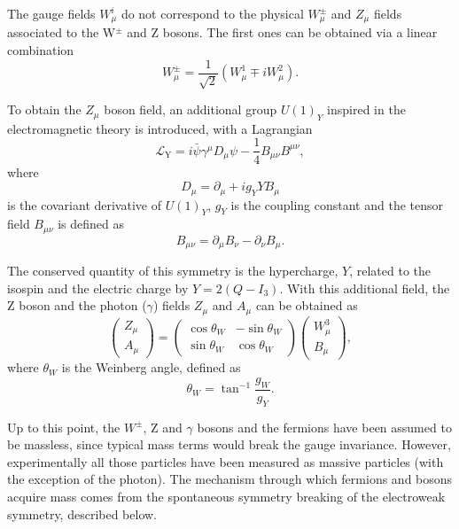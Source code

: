 \documentclass[../main.tex]{subfiles}
\begin{document}
The gauge fields $W_\mu^i$ do not correspond to the physical $W_\mu^\pm$ and $Z_\mu$ fields associated to the W${}^\pm$ and Z bosons. The first ones can be obtained via a linear combination
\begin{equation}
\label{theo:eq:w}
W_\mu^\pm = \frac{1}{\sqrt{2}}(W_\mu^1 \mp i W_\mu^2).
\end{equation}

To obtain the $Z_\mu$ boson field, an additional group $U(1)_Y$ inspired in the electromagnetic theory is introduced, with a Lagrangian
\begin{equation}
\mathcal{L}_\text{Y} = i\bar{\psi}\gamma^\mu D_\mu \psi - \frac{1}{4}B_{\mu\nu}B^{\mu\nu},
\end{equation}
where
\begin{equation}
D_\mu = \partial_\mu + ig_Y Y B_\mu
\end{equation}
is the covariant derivative of $U(1)_Y$, $g_Y$ is the coupling constant and the tensor field $B_{\mu\nu}$ is defined as
\begin{equation}
B_{\mu\nu} = \partial_\mu B_\nu - \partial_\nu B_\mu.
\end{equation}

The conserved quantity of this symmetry is the hypercharge, $Y$, related to the isospin and the electric charge by $Y = 2 (Q - I_3)$. With this additional field, the Z boson and the photon ($\gamma$) fields $Z_\mu$ and $A_\mu$ can be obtained as
\begin{equation}
\label{theo:eq:az}
\left(
\begin{matrix}
Z_\mu \\
A_\mu
\end{matrix}
\right)
=
\left(
\begin{matrix}
\cos \theta_W & - \sin \theta_W \\
\sin \theta_W &   \cos \theta_W
\end{matrix}
\right)
\left(
\begin{matrix}
W^3_\mu \\
B_\mu
\end{matrix}
\right),
\end{equation}
where $\theta_W$ is the Weinberg angle, defined as
\begin{equation}
\theta_W = \tan^{-1} \frac{g_W}{g_Y}.
\end{equation}

Up to this point, the $W^\pm$, Z and $\gamma$ bosons and the fermions have been assumed to be massless, since typical mass terms would break the gauge invariance. However, experimentally all those particles have been measured as massive particles (with the exception of the photon). The mechanism through which fermions and bosons acquire mass comes from the spontaneous symmetry breaking of the electroweak symmetry, described below.
\end{document}
